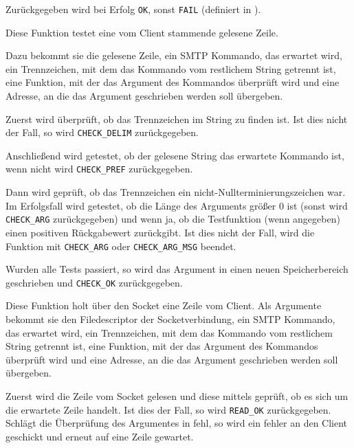Zur\"{u}ckgegeben wird bei Erfolg \texttt{OK}, sonst \texttt{FAIL} (definiert in ).

\label{fn:smtp_check_input}
Diese Funktion testet eine vom Client stammende gelesene Zeile.

Dazu bekommt sie die gelesene Zeile, ein SMTP Kommando, das erwartet wird, ein Trennzeichen, mit dem das Kommando vom restlichem String getrennt ist, eine Funktion, mit der das Argument des Kommandos \"{u}berpr\"{u}ft wird und eine Adresse, an die das Argument geschrieben werden soll \"{u}bergeben.

Zuerst wird \"{u}berpr\"{u}ft, ob das Trennzeichen im String zu finden ist. Ist dies nicht der Fall, so wird \texttt{CHECK\_DELIM} zur\"{u}ckgegeben.

Anschließend wird getestet, ob der gelesene String das erwartete Kommando ist, wenn nicht wird \texttt{CHECK\_PREF} zur\"{u}ckgegeben.

Dann wird gepr\"{u}ft, ob das Trennzeichen ein nicht-Nullterminierungszeichen war. Im Erfolgsfall wird getestet, ob die L\"{a}nge des Arguments gr\"{o}ßer 0 ist (sonst wird \texttt{CHECK\_ARG} zur\"{u}ckgegeben) und wenn ja, ob die Testfunktion (wenn angegeben) einen positiven R\"{u}ckgabewert zur\"{u}ckgibt. Ist dies nicht der Fall, wird die Funktion mit \texttt{CHECK\_ARG} oder \texttt{CHECK\_ARG\_MSG} beendet.

Wurden alle Tests passiert, so wird das Argument in einen neuen Speicherbereich geschrieben und \texttt{CHECK\_OK} zur\"{u}ckgegeben.

\label{fn:smtp_fetch_input_line}
Diese Funktion holt \"{u}ber den Socket eine Zeile vom Client. Als Argumente bekommt sie den Filedescriptor der Socketverbindung, ein SMTP Kommando, das erwartet wird, ein Trennzeichen, mit dem das Kommando vom restlichem String getrennt ist, eine Funktion, mit der das Argument des Kommandos \"{u}berpr\"{u}ft wird und eine Adresse, an die das Argument geschrieben werden soll \"{u}bergeben.

Zuerst wird die Zeile vom Socket gelesen und diese mittels  gepr\"{u}ft, ob es sich um die erwartete Zeile handelt. Ist dies der Fall, so wird \texttt{READ\_OK} zur\"{u}ckgegeben. Schl\"{a}gt die \"{U}berpr\"{u}fung des Argumentes in  fehl, so wird ein fehler an den Client geschickt und erneut auf eine Zeile gewartet.

